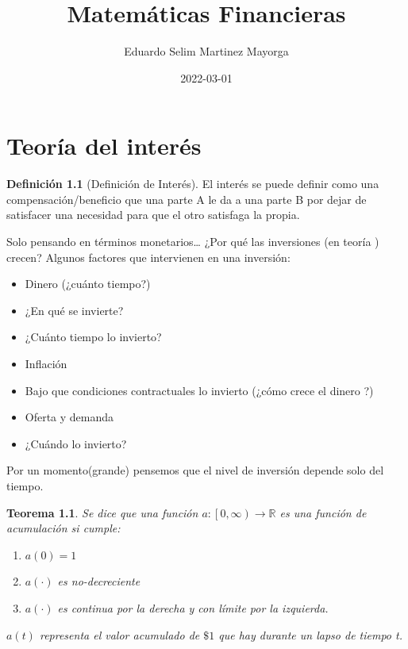 \documentclass[
]{book}
\title{Matemáticas Financieras}
\author{Eduardo Selim Martinez Mayorga}
\date{2022-03-01}
\providecommand{\tightlist}{%
  \setlength{\itemsep}{0pt}\setlength{\parskip}{0pt}}
\newtheorem{theorem}{Teorema}[chapter]
\theoremstyle{definition}
\newtheorem{definition}{Definición}[chapter]
\theoremstyle{definition}
\theoremstyle{definition}
\theoremstyle{definition}
\theoremstyle{remark}
\begin{document}
\maketitle

{
\setcounter{tocdepth}{1}
\tableofcontents
}
\hypertarget{teoruxeda-del-interuxe9s}{%
\chapter{Teoría del interés}\label{teoruxeda-del-interuxe9s}}

\begin{definition}[Definición de Interés]
El interés se puede definir como una compensación/beneficio que una parte A le da a una parte B por dejar de satisfacer una necesidad para que el otro satisfaga la propia.
\end{definition}

Solo pensando en términos monetarios\ldots{} ¿Por qué las inversiones (en teoría ) crecen?
Algunos factores que intervienen en una inversión:

\begin{itemize}
\tightlist
\item
  Dinero (¿cuánto tiempo?)
\item
  ¿En qué se invierte?
\item
  ¿Cuánto tiempo lo invierto?
\item
  Inflación
\item
  Bajo que condiciones contractuales lo invierto (¿cómo crece el dinero ?)
\item
  Oferta y demanda
\item
  ¿Cuándo lo invierto?
\end{itemize}

Por un momento(grande) pensemos que el nivel de inversión depende solo del tiempo.

\begin{theorem}
Se dice que una función \(a:\left[ 0,\infty \right) \longrightarrow \mathbb{R}\) es una función de acumulación si cumple:

\begin{enumerate}
\def\labelenumi{\arabic{enumi}.}
\tightlist
\item
  \(a(0) = 1\)
\item
  \(a\left(\cdot\right)\) es no-decreciente
\item
  \(a(\cdot)\) es continua por la derecha y con límite por la izquierda.
\end{enumerate}

\(a(t)\) representa el valor acumulado de \(\$1\) que hay durante un lapso de tiempo t.
\end{theorem}
\end{document}
